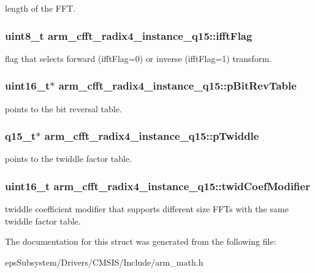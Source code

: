 length of the F\-F\-T. \hypertarget{structarm__cfft__radix4__instance__q15_a2ecff6ea735cb4d22e922d0fd5736655}{
\subsubsection[{ifft\-Flag}]{\setlength{\rightskip}{0pt plus 5cm}uint8\-\_\-t arm\-\_\-cfft\-\_\-radix4\-\_\-instance\-\_\-q15\-::ifft\-Flag}}\label{structarm__cfft__radix4__instance__q15_a2ecff6ea735cb4d22e922d0fd5736655}
flag that selects forward (ifft\-Flag=0) or inverse (ifft\-Flag=1) transform. \hypertarget{structarm__cfft__radix4__instance__q15_a4acf704ae0cf30b53bf0fbfae8e34a59}{
\subsubsection[{p\-Bit\-Rev\-Table}]{\setlength{\rightskip}{0pt plus 5cm}uint16\-\_\-t$\ast$ arm\-\_\-cfft\-\_\-radix4\-\_\-instance\-\_\-q15\-::p\-Bit\-Rev\-Table}}\label{structarm__cfft__radix4__instance__q15_a4acf704ae0cf30b53bf0fbfae8e34a59}
points to the bit reversal table. \hypertarget{structarm__cfft__radix4__instance__q15_a29dd693537e45421a36891f8439e1fba}{
\subsubsection[{p\-Twiddle}]{\setlength{\rightskip}{0pt plus 5cm}q15\-\_\-t$\ast$ arm\-\_\-cfft\-\_\-radix4\-\_\-instance\-\_\-q15\-::p\-Twiddle}}\label{structarm__cfft__radix4__instance__q15_a29dd693537e45421a36891f8439e1fba}
points to the twiddle factor table. \hypertarget{structarm__cfft__radix4__instance__q15_af32fdc78bcc27ca385f9b76a0a1f71c3}{
\subsubsection[{twid\-Coef\-Modifier}]{\setlength{\rightskip}{0pt plus 5cm}uint16\-\_\-t arm\-\_\-cfft\-\_\-radix4\-\_\-instance\-\_\-q15\-::twid\-Coef\-Modifier}}\label{structarm__cfft__radix4__instance__q15_af32fdc78bcc27ca385f9b76a0a1f71c3}
twiddle coefficient modifier that supports different size F\-F\-Ts with the same twiddle factor table. 

The documentation for this struct was generated from the following file\-:\begin{DoxyCompactItemize}
\item 
eps\-Subsystem/\-Drivers/\-C\-M\-S\-I\-S/\-Include/arm\-\_\-math.\-h\end{DoxyCompactItemize}
